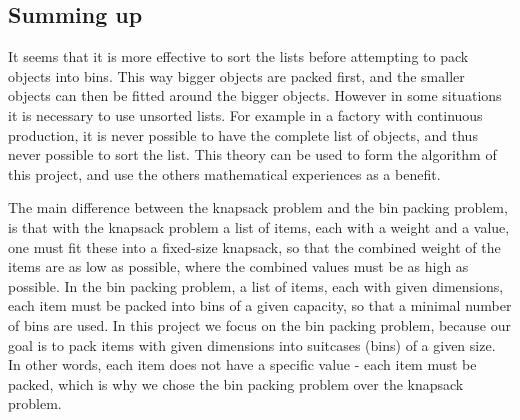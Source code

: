 \subsection{Summing up}
It seems that it is more effective to sort the lists before attempting to pack objects into bins. This way bigger objects are packed first, and the smaller objects can then be fitted around the bigger objects. However in some situations it is necessary to use unsorted lists. For example in a factory with continuous production, it is never possible to have the complete list of objects, and thus never possible to sort the list. This theory can be used to form the algorithm of this project, and use the others mathematical experiences as a benefit.


The main difference between the knapsack problem  and the bin packing problem, is that with the knapsack problem a list of items, each with a weight and a value, one must fit these into a fixed-size knapsack, so that the combined weight of the items are as low as possible, where the combined values must be as high as possible. In the bin packing problem, a list of items, each with given dimensions, each item must be packed into bins of a given capacity, so that a minimal number of bins are used. In this project we focus on the bin packing problem, because our goal is to pack items with given dimensions into suitcases (bins) of a given size. In other words, each item does not have a specific value - each item must be packed, which is why we chose the bin packing problem over the knapsack problem. 


